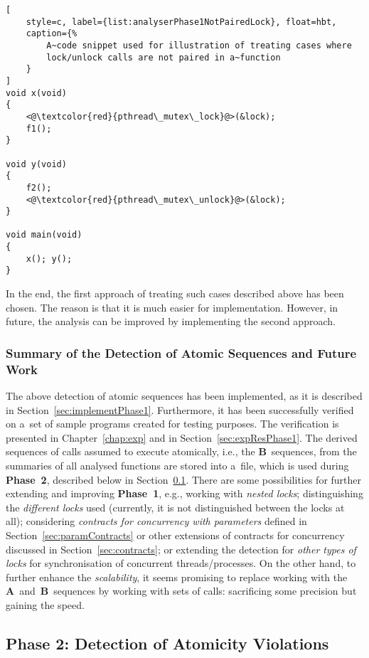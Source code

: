 \begin{lstlisting}[
    style=c, label={list:analyserPhase1NotPairedLock}, float=hbt,
    caption={%
        A~code snippet used for illustration of treating cases where
        lock/unlock calls are not paired in a~function
    }
]
void x(void)
{
    <@\textcolor{red}{pthread\_mutex\_lock}@>(&lock);
    f1();
}

void y(void)
{
    f2();
    <@\textcolor{red}{pthread\_mutex\_unlock}@>(&lock);
}

void main(void)
{
    x(); y();
}
\end{lstlisting}

In the end, the first approach of treating such cases described above has
been chosen. The reason is that it is much easier for implementation.
However, in future, the analysis can be improved by implementing the second
approach.

\newpage
\subsubsection{%
    Summary of the Detection of Atomic Sequences and Future Work
}

The above detection of atomic sequences has been implemented, as it is
described in Section~\ref{sec:implementPhase1}. Furthermore, it has
been successfully verified on a~set of sample programs created for
testing purposes. The verification is presented in Chapter~\ref{chap:exp} and 
in Section~\ref{sec:expResPhase1}. The derived sequences of calls assumed to
execute atomically, i.e., the \textbf{B}~sequences, from the summaries
of all analysed functions are stored into a~file, which is used during
\textbf{Phase~2}, described below in Section~\ref{sec:designPhase2}.
There are some possibilities for further extending and improving
\textbf{Phase~1}, e.g., working with \emph{nested locks}; distinguishing
the \emph{different locks} used (currently, it is not distinguished
between the locks at all); considering \emph{contracts for concurrency with
parameters} defined in Section~\ref{sec:paramContracts} or other extensions
of contracts for concurrency discussed in Section~\ref{sec:contracts}; or
extending the detection for \emph{other types of locks} for synchronisation
of concurrent threads/processes. On the other hand, to further enhance the
\emph{scalability}, it seems promising to replace working with the
\textbf{A}~and~\textbf{B}~sequences by working with sets of calls: sacrificing
some precision but gaining the speed.


\subsection{Phase 2: Detection of Atomicity Violations}
\label{sec:designPhase2}

